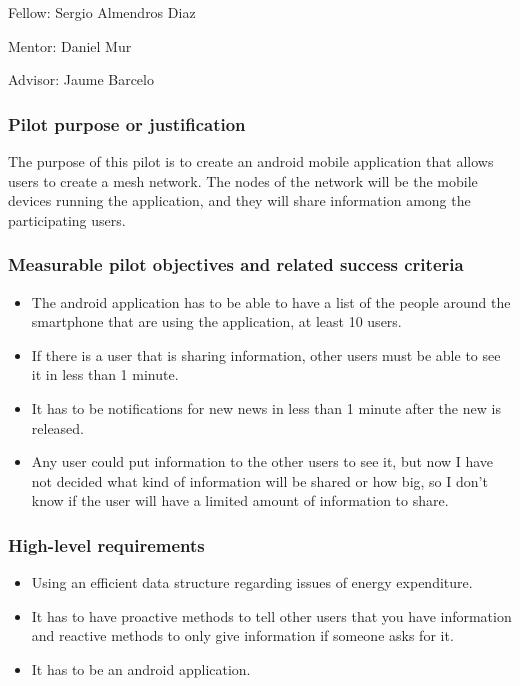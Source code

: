 \documentclass[draftclsnofoot,12pt,journal,onecolumn]{IEEEtran}
\begin{document}
Fellow: Sergio Almendros Diaz

Mentor: Daniel Mur

Advisor: Jaume Barcelo

\subsubsection{Pilot purpose or justification}
The purpose of this pilot is to create an android mobile application that allows users to create a mesh network.
The nodes of the network will be the mobile devices running the application, and they will share information among the participating users.

\subsubsection{Measurable pilot objectives and related success criteria}
\begin{itemize}
\item The android application has to be able to have a list of the people around the smartphone that are using the application, at least 10 users.
\item If there is a user that is sharing information, other users must be able to see it in less than 1 minute.
\item It has to be notifications for new news in less than 1 minute after the new is released.
\item Any user could put information to the other users to see it, but now I have not decided what kind of information will be shared or how big, so I don’t know if the user will have a limited amount of information to share.
\end{itemize}

\subsubsection{High-level requirements}
\begin{itemize}
\item Using an efficient data structure regarding issues of energy expenditure.
\item It has to have proactive methods to tell other users that you have information and reactive methods to only give information if someone asks for it.
\item It has to be an android application.
\end{itemize}
\end{document}
